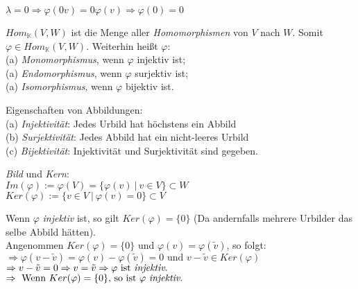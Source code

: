 \documentclass[12pt, a4paper]{report}
\theoremstyle{definition}
\begin{document}
\begin{kor}
  $\lambda = 0 \Rightarrow \varphi(0v) = 0\varphi(v) \Rightarrow \varphi(0) = 0$
\end{kor}

\begin{defi}
  $Hom_{\mathbb{K}}(V, W)$ ist die Menge aller \textit{Homomorphismen} von $V$ nach $W$. Somit
  $\varphi \in Hom_{\mathbb{K}}(V, W)$. Weiterhin heißt $\varphi$: \vspace*{0.2cm} \\
    \indent (a) \textit{Monomorphismus}, wenn $\varphi$ injektiv ist; \vspace*{0.1cm} \\
    \indent (a) \textit{Endomorphismus}, wenn $\varphi$ surjektiv ist; \vspace*{0.1cm} \\
    \indent (a) \textit{Isomorphismus}, wenn $\varphi$ bijektiv ist.
\end{defi}

\begin{rem}
  Eigenschaften von Abbildungen: \vspace*{0.3cm}\\
    \indent (a) \textit{Injektivität}: Jedes Urbild hat höchstens ein Abbild \vspace*{0.2cm} \\
    \indent (b) \textit{Surjektivität}: Jedes Abbild hat ein nicht-leeres Urbild \vspace*{0.2cm} \\
    \indent (c) \textit{Bijektivität}: Injektivität und Surjektivität sind gegeben.
\end{rem}

\begin{defi}
  \textit{Bild} und \textit{Kern}: \vspace*{0.2cm} \\
    \indent $Im(\varphi) := \varphi(V) = \{ \varphi(v) \ | \ v \in V\} \subset W$ \vspace*{0.2cm}\\
    \indent$Ker(\varphi) := \{v \in V \ | \ \varphi(v) = 0\} \subset V$ 
\end{defi}

\begin{lem}
  Wenn $\varphi$ \textit{injektiv} ist, so gilt $Ker(\varphi)=\{0 \}$ (Da andernfalls mehrere Urbilder    das    selbe Abbild hätten). \\
Angenommen $Ker(\varphi)=\{0 \} \text{ und } \varphi(v) = \varphi(\tilde{v})$, so folgt: \\
  \indent $\Rightarrow \varphi(v - \tilde{v}) = \varphi(v) - \varphi(\tilde{v}) = 0 \text{ und } v - \tilde{v} \in Ker(\varphi)$ \\
  \indent $\Rightarrow v - \tilde{v} = 0 \Rightarrow v = \tilde{v} \Rightarrow \varphi \text{ ist \textit{injektiv}.}$ \\
  \indent $\Rightarrow \text{ Wenn } Ker(\varphi) = \{0\} \text{, so ist } \varphi \text{ \textit{injektiv}.}$
\end{lem}
\end{document}
